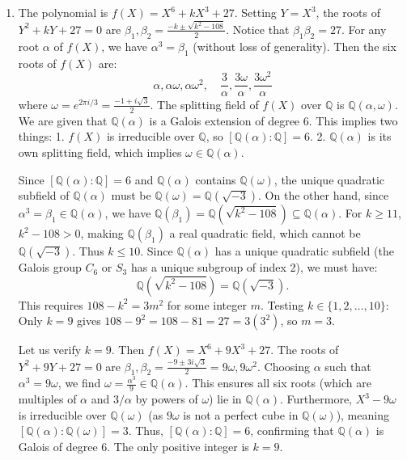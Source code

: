 \documentclass{article}
\begin{document}
\begin{enumerate}[label=\fbox{\arabic*}]
  \item %
        The polynomial is $f(X) = X^6 + kX^3 + 27$.
        Setting $Y = X^3$, the roots of $Y^2 + kY + 27 = 0$ are $\beta_1, \beta_2 = \frac{-k \pm \sqrt{k^2 - 108}}{2}$.
        Notice that $\beta_1 \beta_2 = 27$. For any root $\alpha$ of $f(X)$, we have $\alpha^3 = \beta_1$ (without loss of generality). Then the six roots of $f(X)$ are:
        \[
          \alpha, \alpha\omega, \alpha\omega^2, \quad \frac{3}{\alpha}, \frac{3\omega}{\alpha}, \frac{3\omega^2}{\alpha}
        \]
        where $\omega = e^{2\pi i/3} = \frac{-1+i\sqrt{3}}{2}$.
        The splitting field of $f(X)$ over $\mathbb{Q}$ is $\mathbb{Q}(\alpha, \omega)$. 
        We are given that $\mathbb{Q}(\alpha)$ is a Galois extension of degree 6. This implies two things:
        1. $f(X)$ is irreducible over $\mathbb{Q}$, so $[\mathbb{Q}(\alpha) : \mathbb{Q}] = 6$.
        2. $\mathbb{Q}(\alpha)$ is its own splitting field, which implies $\omega \in \mathbb{Q}(\alpha)$.

        Since $[\mathbb{Q}(\alpha) : \mathbb{Q}] = 6$ and $\mathbb{Q}(\alpha)$ contains $\mathbb{Q}(\omega)$, the unique quadratic subfield of $\mathbb{Q}(\alpha)$ must be $\mathbb{Q}(\omega) = \mathbb{Q}(\sqrt{-3})$.
        On the other hand, since $\alpha^3 = \beta_1 \in \mathbb{Q}(\alpha)$, we have $\mathbb{Q}(\beta_1) = \mathbb{Q}(\sqrt{k^2 - 108}) \subseteq \mathbb{Q}(\alpha)$.
        For $k \ge 11$, $k^2 - 108 > 0$, making $\mathbb{Q}(\beta_1)$ a real quadratic field, which cannot be $\mathbb{Q}(\sqrt{-3})$. Thus $k \le 10$.
        Since $\mathbb{Q}(\alpha)$ has a unique quadratic subfield (the Galois group $C_6$ or $S_3$ has a unique subgroup of index 2), we must have:
        \[
          \mathbb{Q}(\sqrt{k^2 - 108}) = \mathbb{Q}(\sqrt{-3}).
        \]
        This requires $108 - k^2 = 3m^2$ for some integer $m$.
        Testing $k \in \{1, 2, \dots, 10\}$:
        Only $k = 9$ gives $108 - 9^2 = 108 - 81 = 27 = 3(3^2)$, so $m = 3$.
        
        Let us verify $k = 9$. Then $f(X) = X^6 + 9X^3 + 27$.
        The roots of $Y^2 + 9Y + 27 = 0$ are $\beta_1, \beta_2 = \frac{-9 \pm 3i\sqrt{3}}{2} = 9\omega, 9\omega^2$.
        Choosing $\alpha$ such that $\alpha^3 = 9\omega$, we find $\omega = \frac{\alpha^3}{9} \in \mathbb{Q}(\alpha)$.
        This ensures all six roots (which are multiples of $\alpha$ and $3/\alpha$ by powers of $\omega$) lie in $\mathbb{Q}(\alpha)$.
        Furthermore, $X^3 - 9\omega$ is irreducible over $\mathbb{Q}(\omega)$ (as $9\omega$ is not a perfect cube in $\mathbb{Q}(\omega)$), meaning $[\mathbb{Q}(\alpha) : \mathbb{Q}(\omega)] = 3$.
        Thus, $[\mathbb{Q}(\alpha) : \mathbb{Q}] = 6$, confirming that $\mathbb{Q}(\alpha)$ is Galois of degree 6.
        The only positive integer is $k = 9$.


\end{enumerate}
\end{document}
